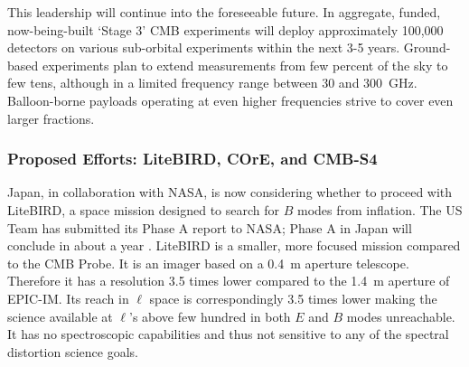 This leadership will continue into the foreseeable future. In aggregate, funded, now-being-built 
`Stage 3' CMB experiments will deploy approximately 100,000 detectors on various sub-orbital 
experiments within the next 3-5 years. 
Ground-based experiments plan to extend measurements from few percent of the sky to 
few tens, although in a limited frequency range between 30 and 300~GHz. Balloon-borne 
payloads operating at even higher frequencies strive to cover even larger fractions.  



\vspace{-0.18in}

\subsubsection{Proposed Efforts: LiteBIRD, COrE, and CMB-S4} 

\vspace{-0.05in}

Japan, in collaboration with NASA, is now considering whether to proceed with LiteBIRD, a space mission 
designed to search for $B$ modes from inflation. The US Team has submitted its Phase A report to NASA; Phase A 
in Japan will conclude in about a year . LiteBIRD is a smaller, more focused
mission compared to the CMB Probe. It is an imager based on a 0.4~m aperture 
telescope. Therefore it has a resolution 3.5 times lower compared to the 1.4~m aperture of EPIC-IM. Its
reach in $\ell$ space is correspondingly 3.5 times lower making the science available at $\ell$'s above 
few hundred in both $E$ and $B$ modes unreachable. 
It has no spectroscopic capabilities and thus not sensitive to any of the spectral distortion science goals. 

